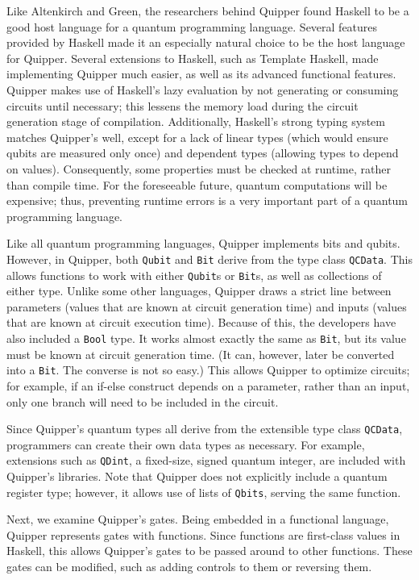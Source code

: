 \documentclass[]{article}
\begin{document}
Like Altenkirch and Green, the researchers behind Quipper found Haskell to be a good host language for a quantum programming language. Several features provided by Haskell made it an especially natural choice to be the host language for Quipper. Several extensions to Haskell, such as Template Haskell, made implementing Quipper much easier, as well as its advanced functional features. Quipper makes use of Haskell's lazy evaluation by not generating or consuming circuits until necessary; this lessens the memory load during the circuit generation stage of compilation. Additionally, Haskell's strong typing system matches Quipper's well, except for a lack of linear types (which would ensure qubits are measured only once) and dependent types (allowing types to depend on values). Consequently, some properties must be checked at runtime, rather than compile time. For the foreseeable future, quantum computations will be expensive; thus, preventing runtime errors is a very important part of a quantum programming language.

Like all quantum programming languages, Quipper implements bits and qubits. However, in Quipper, both \texttt{Qubit} and \texttt{Bit} derive from the type class \texttt{QCData}. This allows functions to work with either \texttt{Qubit}s or \texttt{Bit}s, as well as collections of either type. Unlike some other languages, Quipper draws a strict line between parameters (values that are known at circuit generation time) and inputs (values that are known at circuit execution time). Because of this, the developers have also included a \texttt{Bool} type. It works almost exactly the same as \texttt{Bit}, but its value must be known at circuit generation time. (It can, however, later be converted into a \texttt{Bit}. The converse is not so easy.) This allows Quipper to optimize circuits; for example, if an if-else construct depends on a parameter, rather than an input, only one branch will need to be included in the circuit.

Since Quipper's quantum types all derive from the extensible type class \texttt{QCData}, programmers can create their own data types as necessary. For example, extensions such as \texttt{QDint}, a fixed-size, signed quantum integer, are included with Quipper's libraries. Note that Quipper does not explicitly include a quantum register type; however, it allows use of lists of \texttt{Qbits}, serving the same function.

Next, we examine Quipper's gates. Being embedded in a functional language, Quipper represents gates with functions. Since functions are first-class values in Haskell, this allows Quipper's gates to be passed around to other functions. These gates can be modified, such as adding controls to them or reversing them.
\end{document}
